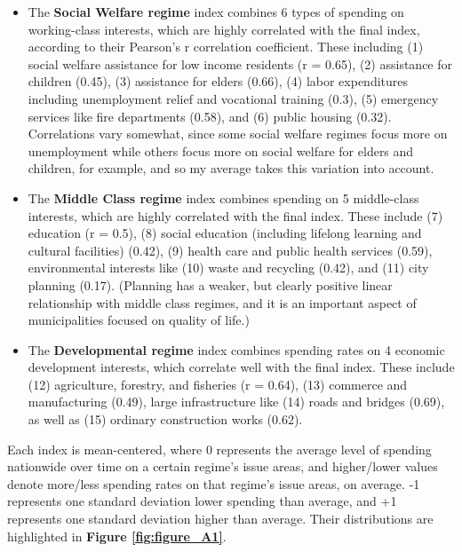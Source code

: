 \documentclass[preprint, 3p,
authoryear]{elsarticle} %
\begin{document}
\begin{itemize}
\item
  The \textbf{Social Welfare regime} index combines 6 types of spending
  on working-class interests, which are highly correlated with the final
  index, according to their Pearson's r correlation coefficient. These
  including (1) social welfare assistance for low income residents (r =
  0.65), (2) assistance for children (0.45), (3) assistance for elders
  (0.66), (4) labor expenditures including unemployment relief and
  vocational training (0.3), (5) emergency services like fire
  departments (0.58), and (6) public housing (0.32). Correlations vary
  somewhat, since some social welfare regimes focus more on unemployment
  while others focus more on social welfare for elders and children, for
  example, and so my average takes this variation into account.
\item
  The \textbf{Middle Class regime} index combines spending on 5
  middle-class interests, which are highly correlated with the final
  index. These include (7) education (r = 0.5), (8) social education
  (including lifelong learning and cultural facilities) (0.42), (9)
  health care and public health services (0.59), environmental interests
  like (10) waste and recycling (0.42), and (11) city planning (0.17).
  (Planning has a weaker, but clearly positive linear relationship with
  middle class regimes, and it is an important aspect of municipalities
  focused on quality of life.)
\item
  The \textbf{Developmental regime} index combines spending rates on 4
  economic development interests, which correlate well with the final
  index. These include (12) agriculture, forestry, and fisheries (r =
  0.64), (13) commerce and manufacturing (0.49), large infrastructure
  like (14) roads and bridges (0.69), as well as (15) ordinary
  construction works (0.62).
\end{itemize}

Each index is mean-centered, where 0 represents the average level of
spending nationwide over time on a certain regime's issue areas, and
higher/lower values denote more/less spending rates on that regime's
issue areas, on average. -1 represents one standard deviation lower
spending than average, and +1 represents one standard deviation higher
than average. Their distributions are highlighted in
\textbf{Figure \ref{fig:figure_A1}}.
\end{document}
